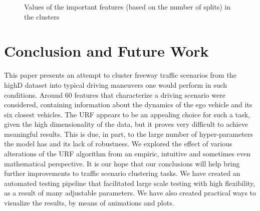 \documentclass[conference]{IEEEtran}
\begin{document}
\begin{figure}[!h]
\centering
{}
\hfill
{}
\caption{Values of the important features (based on the number of splits) in the clusters} 
\label{fig:boxplots}
\end{figure}

\section{Conclusion and Future Work}
\label{section:conclusion}
This paper presents an attempt to cluster freeway traffic scenarios from the highD dataset into typical driving maneuvers one would perform in such conditions. Around 60 features that characterize a driving scenario were considered, containing information about the dynamics of the ego vehicle and its six closest vehicles. The URF appears to be an appealing choice for such a task, given the high dimensionality of the data, but it proves very difficult to achieve meaningful results. This is due, in part, to the large number of hyper-parameters the model has and its lack of robustness. We explored the effect of various alterations of the URF algorithm from an empiric, intuitive and sometimes even mathematical perspective. It is our hope that our conclusions will help bring further improvements to traffic scenario clustering tasks. We have created an automated testing pipeline that facilitated large scale testing with high flexibility, as a result of many adjustable parameters. We have also created practical ways to visualize the results, by means of animations and plots.
\end{document}
